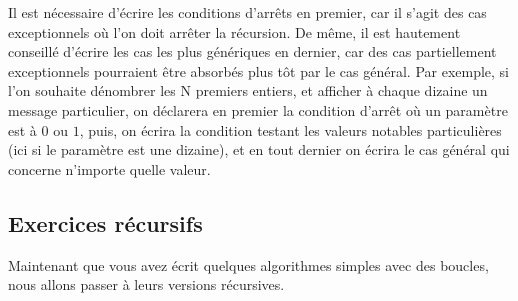 \documentclass[11pt,a4paper]{article}
\begin{document}
\smallskip

Il est nécessaire d'écrire les conditions d'arrêts en premier, car il s'agit des cas exceptionnels où l'on doit arrêter la récursion.
De même, il est hautement conseillé d'écrire les cas les plus génériques en dernier, car des cas partiellement exceptionnels pourraient être absorbés plus tôt par le cas général.
Par exemple, si l'on souhaite dénombrer les N premiers entiers, et afficher à chaque dizaine un message particulier, on déclarera en premier la condition d'arrêt où un paramètre est à $ 0 $ ou $ 1 $, puis, on écrira la condition testant les valeurs notables particulières (ici si le paramètre est une dizaine), et en tout dernier on écrira le cas général qui concerne n'importe quelle valeur.

\bigskip


\subsection{Exercices récursifs}

Maintenant que vous avez écrit quelques algorithmes simples avec des boucles, nous allons passer à leurs versions récursives.

\bigskip


\bigskip
\end{document}

